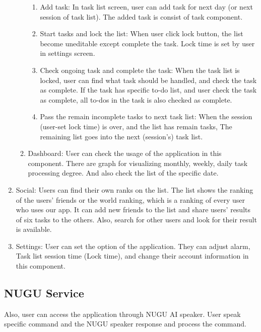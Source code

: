 \documentclass[conference]{IEEEtran}
\begin{document}
\begin{enumerate}
\begin{enumerate}
\begin{enumerate}
            \item Add task: In task list screen, user can add task for next day (or next session of task list). The added task is consist of task component.
            \item Start tasks and lock the list: When user click lock button, the list become uneditable except complete the task. Lock time is set by user in settings screen.
            \item Check ongoing task and complete the task: When the task list is locked, user can find what task should be handled, and check the task as complete. If the task has specific to-do list, and user check the task as complete, all to-dos in the task is also checked as complete.
            \item Pass the remain incomplete tasks to next task list: When the session (user-set lock time) is over, and the list has remain tasks, The remaining list goes into the next (session's) task list.\\
        \end{enumerate}
        \item Dashboard: User can check the usage of the application in this component. There are graph for visualizing monthly, weekly, daily task processing degree. And also check the list of the specific date.\\
    \end{enumerate}
    
    \item Social: Users can find their own ranks on the list. The list shows the ranking of the users' friends or the world ranking, which is a ranking of every user who uses our app. It can add new friends to the list and share users' results of six tasks to the others. Also, search for other users and look for their result is available. \\
    \item Settings: User can set the option of the application. They can adjust alarm, Task list session time (Lock time), and change their account information in this component.\\

\end{enumerate}

\subsection{NUGU Service}

Also, user can access the application through NUGU AI speaker. User speak specific command and the NUGU speaker response and process the command. \\
\end{document}
